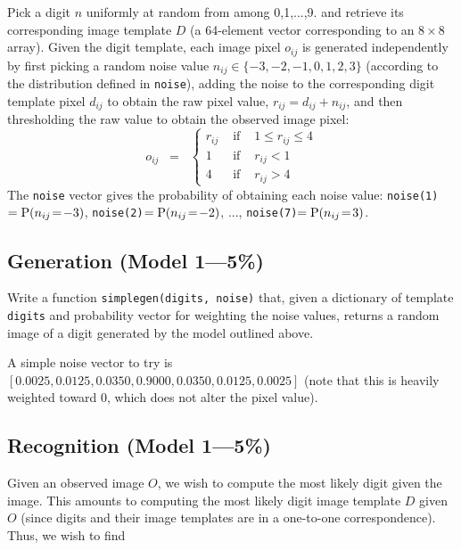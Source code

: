\documentclass[12pt]{article}
\begin{document}


\noindent
Pick a digit $n$ uniformly at random from among 0,1,...,9.
and retrieve its corresponding image template $D$ (a 64-element vector corresponding to an $8\times8$ array).
Given the digit template, each image pixel $o_{ij}$ is generated independently 
by first picking a random noise value $n_{ij}\in\{-3,-2,-1,0,1,2,3\}$
(according to the distribution defined in {\tt noise}),
adding the noise to the corresponding digit template pixel $d_{ij}$
to obtain the raw pixel value, $r_{ij}=d_{ij}+n_{ij}$,
and then thresholding the raw value to obtain the observed image pixel:
\[
o_{ij} \;\;=\;\;\left\{\begin{array}{cll}
r_{ij} & \mbox{ if } & 1\leq r_{ij}\leq4\\
1 & \mbox{ if } & r_{ij} < 1\\
4 & \mbox{ if } & r_{ij} > 4
\end{array}\right.
\]
The {\tt noise} vector gives the probability of obtaining each noise value:
{\tt noise(1)}$={\rm P}(n_{ij}\!=\!-3)$,
{\tt noise(2)}$={\rm P}(n_{ij}\!=\!-2)$,
...,
{\tt noise(7)}$={\rm P}(n_{ij}\!=\!3)$.

\subsection{Generation \rm(Model 1---5\%)}

Write a  function {\tt simplegen(digits, noise)} that, given a dictionary of template {\tt digits} and probability vector for weighting the noise values,
 returns a random image of a digit generated by the model outlined above.

A simple noise vector to try is $ [0.0025,    0.0125,    0.0350,    0.9000,    0.0350,    0.0125,    0.0025]$ (note that this is heavily weighted toward 0, which does not alter the pixel value).


\subsection{Recognition \rm(Model 1---5\%)}

Given an observed image $O$, we wish to compute the most likely
digit given the image.  This amounts to computing the most likely
digit image template $D$ given $O$
(since digits and their image templates are in a one-to-one correspondence).
Thus, we wish to find
\end{document}
